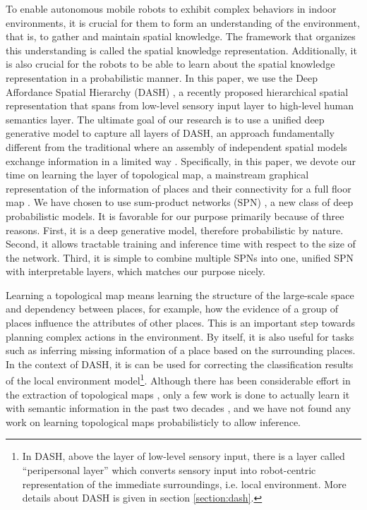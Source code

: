 \documentclass[10pt, titlepage]{article}
\theoremstyle{definition}
\begin{document}
To enable autonomous mobile robots to exhibit complex behaviors in indoor environments, it is crucial for them to form an understanding of the environment, that is, to gather and maintain spatial knowledge. The framework that organizes this understanding is called the spatial knowledge representation. Additionally, it is also crucial for the robots to be able to learn about the spatial knowledge representation in a probabilistic manner. In this paper, we use the Deep Affordance Spatial Hierarchy (DASH) \cite{pronobis2017deep}, a recently proposed hierarchical spatial representation that spans from low-level sensory input layer to high-level human semantics layer.  The ultimate goal of our research is to use a unified deep generative model to capture all layers of DASH, an approach fundamentally different from the traditional where an assembly of independent spatial models exchange information in a limited way \cite{pronobis2016learning}. 
Specifically, in this paper, we devote our time on learning the layer of topological map, a mainstream graphical representation of the information of places and their connectivity for a full floor map \cite{remolina2004towards}.  We have chosen to use sum-product networks (SPN) \cite{poon2011sum}, a new class of deep probabilistic models. It is favorable for our purpose primarily because of three reasons. First, it is a deep generative model, therefore probabilistic by nature. Second, it allows tractable training and inference time with respect to the size of the network. Third, it is simple to combine multiple SPNs into one, unified SPN with interpretable layers, which matches our purpose nicely.

Learning a topological map means learning the structure of the large-scale space and dependency between places, for example, how the evidence of a group of places influence the attributes of other places. This is an important step towards planning complex actions in the environment. By itself, it is also useful for tasks such as inferring missing information of a place based on the surrounding places. In the context of DASH, it is can be used for correcting the classification results of the local environment model\footnote{In DASH, above the layer of low-level sensory input, there is a layer called ``peripersonal layer'' which converts sensory input into robot-centric representation of the immediate surroundings, i.e. local environment. More details about DASH is given in section \ref{section:dash}.}. Although there has been considerable effort in the extraction of topological maps \cite{ranganathan2011online}\cite{shi2010online}\cite{tomatis2003hybrid}, only a few work is done to actually learn it with semantic information in the past two decades \cite{aydemir2012can}\cite{mozos2006supervised}, and we have not found any work on learning topological maps probabilisticly to allow inference.
\end{document}
